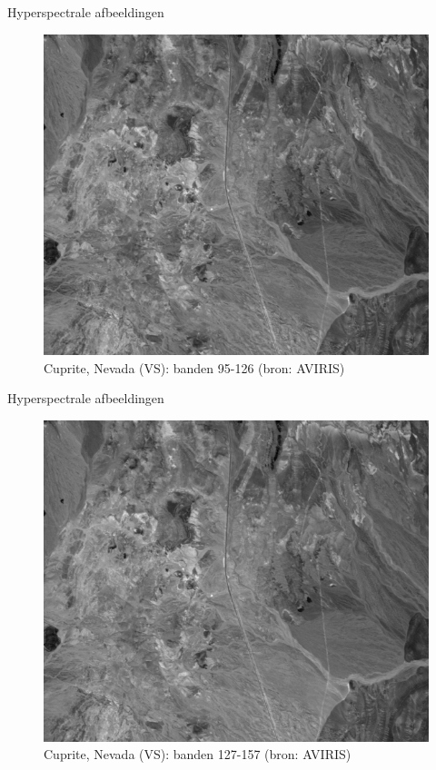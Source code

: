 \documentclass[t,12pt,dutch
\ifx\beamermode\undefined\else,\beamermode\fi
]{beamer}
\begin{document}
\begin{frame}{Hyperspectrale afbeeldingen}

\begin{figure}[H]
\centering
\includegraphics[scale=0.3]{images/cuprite_bands_95-127.png}
\caption{Cuprite, Nevada (VS): banden 95-126 (bron: AVIRIS)}
\end{figure}

\end{frame}

\begin{frame}{Hyperspectrale afbeeldingen}

\begin{figure}[H]
\centering
\includegraphics[scale=0.3]{images/cuprite_bands_127-158.png}
\caption{Cuprite, Nevada (VS): banden 127-157 (bron: AVIRIS)}
\end{figure}

\end{frame}
\end{document}
